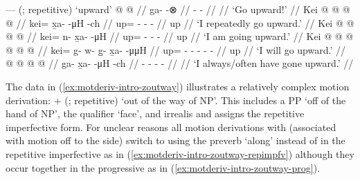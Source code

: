 \documentclass[12pt,letterpaper,oneside,article]{memoir}
\begin{document}
\pex\label{ex:motderiv-intro-ming}%
\a\label{ex:motderiv-intro-ming-deriv}%
%
	— (;  repetitive) ‘upward’
\a\label{ex:motderiv-intro-ming-imp}%
%
\begingl
	\gla	{} @ {} @ {} //
	\glb	ga-  -⊗ //
	\glc	{}-  - //
	\gld	{} {} {} //
	\glft	‘Go upward!’
		//
\endgl
\a\label{ex:motderiv-intro-ming-repimpfv}%
%
\begingl
	\gla	Kei @  @ {} @ {} @ {} //
	\glb	kei= x̱a-  -μH -ch //
	\glc	up= -  - - //
	\gld	up  {} {} {} //
	\glft	‘I repeatedly go upward.’
		//
\endgl
\a\label{ex:motderiv-intro-ming-prog}%
%
\begingl
	\gla	Kei @  @ {} @ {} @ {} //
	\glb	kei= n- x̱a-  -μH //
	\glc	up= - -  - //
	\gld	up  {} {} {} //
	\glft	‘I am going upward.’
		//
\endgl
\a\label{ex:motderiv-intro-ming-prosp}%
%
\begingl
	\gla	Kei @  @ {} @ {} @ {} @ {} @ {} //
	\glb	kei= g- w- g̱- x̱a-  -μμH //
	\glc	up= - - - -  - //
	\gld	up  {} {} {} {} {} //
	\glft	‘I will go upward.’
		//
\endgl
\a\label{ex:motderiv-intro-ming-hab}%
%
\begingl
	\gla	{} @ {} @ {} @ {} @ {} //
	\glb	ga- x̱a-  -μH -ch //
	\glc	{}- -  - - //
	\gld	{} {} {} {} {} //
	\glft	‘I always/often have gone upward.’
		//
\endgl
\xe

The data in (\ref{ex:motderiv-intro-zoutway}) illustrates a relatively complex motion derivation:  +  (;  repetitive) ‘out of the way of NP’.
This includes a PP  ‘off of the hand of NP’, the qualifier  ‘face’, and irrealis  and assigns the  repetitive imperfective form.
For unclear reasons all motion derivations with  (associated with motion off to the side) switch to using the preverb  ‘along’ instead of  in the repetitive imperfective as in (\ref{ex:motderiv-intro-zoutway-repimpfv}) although they occur together in the progressive as in (\ref{ex:motderiv-intro-zoutway-prog}).
\end{document}
